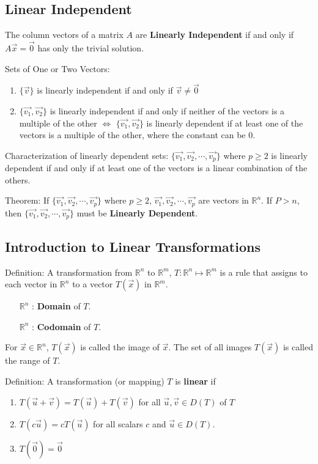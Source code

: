 \documentclass[12pt]{article}
\begin{document}
\subsection{Linear Independent}
The column vectors of a matrix $A$ are {\bf Linearly Independent} if and only if $A\vec{x} = \vec{0}$ has only the trivial solution.

Sets of One or Two Vectors:
\begin{enumerate}
    \item $\{\vec{v}\}$ is linearly independent if and only if $\vec{v} \neq \vec{0}$
    \item $\{\vec{v_1}, \vec{v_2}\}$ is linearly independent if and only if neither of the vectors is a multiple of the other $\iff$ $\{\vec{v_1}, \vec{v_2}\}$ is linearly dependent if at least one of the vectors is a multiple of the other, where the constant can be 0.
\end{enumerate}

Characterization of linearly dependent sets:
$\{\vec{v_1}, \vec{v_2}, \cdots , \vec{v_p}\}$ where $p\geq 2$ is linearly dependent if and only if at least one of the vectors is a linear combination of the others.

Theorem: If $\{\vec{v_1}, \vec{v_2}, \cdots , \vec{v_p}\}$ where $p\geq 2$, $\vec{v_1}, \vec{v_2}, \cdots , \vec{v_p}$ are vectors in $\mathbb{R}^n$. If ${P>n}$, then $\{\vec{v_1}, \vec{v_2}, \cdots , \vec{v_p}\}$ must be {\bf Linearly Dependent}.

\subsection{Introduction to Linear Transformations}
Definition: A transformation from $\mathbb{R}^n$ to $\mathbb{R}^m$, $T: \mathbb{R}^n  \longmapsto  \mathbb{R}^m$ is a rule that assigns to each vector in $\mathbb{R}^n$ to a vector $T(\vec{x})$ in $\mathbb{R}^m$.
\begin{enumerate}
    \item[$\mathbb{R}^n$ :] {\bf Domain} of $T$.
    \item[$\mathbb{R}^n$ :] {\bf Codomain} of $T$.
\end{enumerate}
For $\vec{x}\in \mathbb{R}^n$, $T(\vec{x})$ is called the image of $\vec{x}$. The set of all images $T(\vec{x})$ is called the range of $T$.

Definition: A transformation (or mapping) $T$ is {\bf linear} if 
\begin{enumerate}
    \item $T(\vec{u}+\vec{v}) = T(\vec{u}) + T(\vec{v})$ for all $\vec{u}, \vec{v} \in D(T)$ of $T$
    \item $T(c\vec{u}) = cT(\vec{u})$ for all scalars $c$ and $\vec{u} \in D(T)$.
    \item $T(\vec{0}) = \vec{0}$
\end{enumerate}
\end{document}
